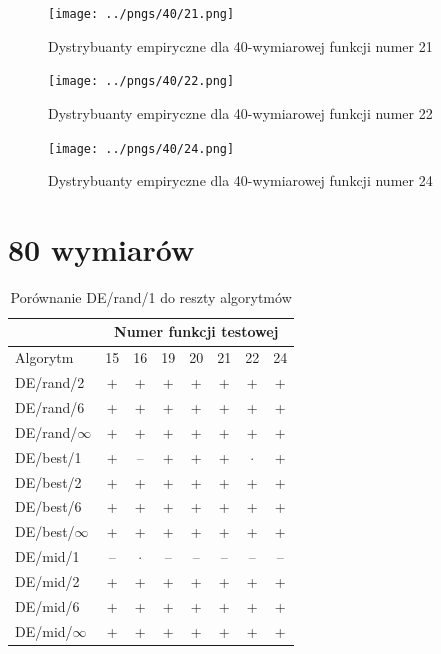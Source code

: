 \documentclass[a4paper,onecolumn,oneside,12pt,wide,floatssmall]{mwrep}
\theoremstyle{definition}
\theoremstyle{plain}%
\theoremstyle{remark}
\begin{document}
\begin{figure}[H]
\centering
\texttt{[image: ../pngs/40/21.png]}
\caption{Dystrybuanty empiryczne dla 40-wymiarowej funkcji numer 21}
\end{figure}

\begin{figure}[H]
\centering
\texttt{[image: ../pngs/40/22.png]}
\caption{Dystrybuanty empiryczne dla 40-wymiarowej funkcji numer 22}
\end{figure}

\begin{figure}[H]
\centering
\texttt{[image: ../pngs/40/24.png]}
\caption{Dystrybuanty empiryczne dla 40-wymiarowej funkcji numer 24}
\end{figure}

\section{80 wymiarów}

\begin{table}[H]
\centering
\begin{tabular}{ l | c | c | c | c | c | c | c }
		 & \multicolumn{7}{c}{Numer funkcji testowej}  \\  \hline
Algorytm         &15& 16& 19& 20& 21& 22& 24 \\ \hline
DE/rand/2	 & + & + & + & + & + & + & + \\
DE/rand/6	 & + & + & + & + & + & + & + \\
DE/rand/$\infty$	 & + & + & + & + & + & + & + \\
DE/best/1	 & + & -- & + & + & + & $\cdot$ & + \\
DE/best/2	 & + & + & + & + & + & + & + \\
DE/best/6	 & + & + & + & + & + & + & + \\
DE/best/$\infty$	 & + & + & + & + & + & + & + \\
DE/mid/1	 & -- & $\cdot$ & -- & -- & -- & -- & -- \\
DE/mid/2	 & + & + & + & + & + & + & + \\
DE/mid/6	 & + & + & + & + & + & + & + \\
DE/mid/$\infty$	 & + & + & + & + & + & + & + \\
\end{tabular}
\caption{Porównanie DE/rand/1 do reszty algorytmów}
\end{table}
\end{document}
